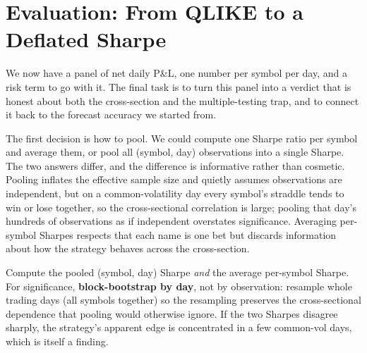 \section{Evaluation: From QLIKE to a Deflated Sharpe}
\label{sec:ivrv:evaluation}

We now have a panel of net daily P\&L, one number per symbol per day, and a risk term to go with it. The final task is to turn this panel into a verdict that is honest about both the cross-section and the multiple-testing trap, and to connect it back to the forecast accuracy we started from.

The first decision is how to pool. We could compute one Sharpe ratio per symbol and average them, or pool all (symbol, day) observations into a single Sharpe. The two answers differ, and the difference is informative rather than cosmetic. Pooling inflates the effective sample size and quietly assumes observations are independent, but on a common-volatility day every symbol's straddle tends to win or lose together, so the cross-sectional correlation is large; pooling that day's hundreds of observations as if independent overstates significance. Averaging per-symbol Sharpes respects that each name is one bet but discards information about how the strategy behaves across the cross-section.

\begin{keyidea}
Compute the pooled (symbol, day) Sharpe \emph{and} the average per-symbol Sharpe. For significance, \textbf{block-bootstrap by day}, not by observation: resample whole trading days (all symbols together) so the resampling preserves the cross-sectional dependence that pooling would otherwise ignore. If the two Sharpes disagree sharply, the strategy's apparent edge is concentrated in a few common-vol days, which is itself a finding.
\end{keyidea}

